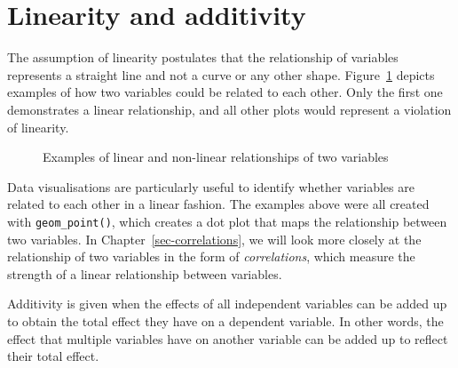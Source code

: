 \documentclass[
  letterpaper,
]{krantz}
\begin{document}
\section{Linearity and additivity}\label{sec-additivity-and-linearity}

The assumption of linearity postulates that the relationship of
variables represents a straight line and not a curve or any other shape.
Figure~\ref{fig-linear-nonlinear-relationships} depicts examples of how
two variables could be related to each other. Only the first one
demonstrates a linear relationship, and all other plots would represent
a violation of linearity.

\begin{figure}


\caption{\label{fig-linear-nonlinear-relationships}Examples of linear
and non-linear relationships of two variables}

\end{figure}%

Data visualisations are particularly useful to identify whether
variables are related to each other in a linear fashion. The examples
above were all created with \texttt{geom\_point()}, which creates a dot
plot that maps the relationship between two variables. In
Chapter~\ref{sec-correlations}, we will look more closely at the
relationship of two variables in the form of \emph{correlations}, which
measure the strength of a linear relationship between variables.

Additivity is given when the effects of all independent variables can be
added up to obtain the total effect they have on a dependent variable.
In other words, the effect that multiple variables have on another
variable can be added up to reflect their total effect.
\end{document}
